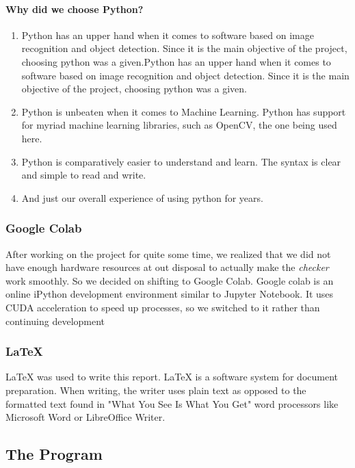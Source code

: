 \documentclass[a4paper]{article}
\begin{document}
\paragraph{Why did we choose Python?}
\begin{enumerate}
    \item Python has an upper hand when it comes to software based on
          image recognition and object detection. Since it is the main
          objective of the project, choosing python was a given.Python has an upper hand when it comes to software based on
          image recognition and object detection. Since it is the main
          objective of the project, choosing python was a given.
    \item Python is unbeaten when it comes to Machine Learning. Python has
          support for myriad machine learning libraries, such as OpenCV, the
          one being used here.
    \item Python is comparatively easier to understand and learn. The syntax
          is clear and simple to read and write.
    \item And just our overall experience of using python for years.
\end{enumerate}

\subsubsection{Google Colab}
After working on the project for quite some time, we realized that we did
not have enough hardware resources at out disposal to actually make the
\textit{checker} work smoothly. So we decided on shifting to Google Colab.
Google colab is an online iPython development environment similar to
Jupyter Notebook. It uses CUDA acceleration to speed up processes, so we
switched to it rather than continuing development

\subsubsection{LaTeX}
LaTeX was used to write this report. LaTeX is a software system for document
preparation. When writing, the writer uses plain text as opposed to the formatted
text found in "What You See Is What You Get" word processors like Microsoft Word
or LibreOffice Writer.
\pagebreak

\subsection{The Program}
\end{document}
